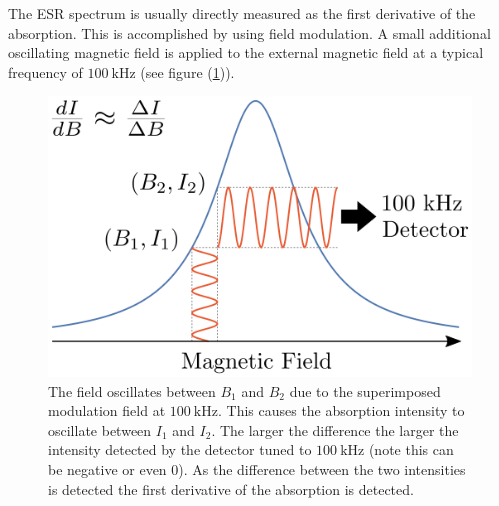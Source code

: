 \documentclass[%
 reprint,
nofootinbib,
 amsmath,amssymb,
 aps,
floatfix,
]{revtex4-2}
\begin{document}
    \par
    The ESR spectrum is usually directly measured as the first derivative of the absorption. This is accomplished by using field modulation. A small additional oscillating magnetic field is applied to the external magnetic field at a typical frequency of $\SI{100}{\kilo \hertz}$ (see figure (\ref{fig:ESRfm})).
    \begin{figure}
        \centering
        \includegraphics[scale = 0.4]{Figures/EPR_Field_Modulation.svg.png}
        \caption{The field oscillates between $B_1$ and $B_2$ due to the superimposed modulation field at $\SI{100}{\kilo \hertz}$. This causes the absorption intensity to oscillate between $I_1$ and $I_2$. The larger the difference the larger the intensity detected by the detector tuned to $\SI{100}{\kilo \hertz}$ (note this can be negative or even 0). As the difference between the two intensities is detected the first derivative of the absorption is detected.}
        \label{fig:ESRfm}
    \end{figure}
    
    
\end{document}
